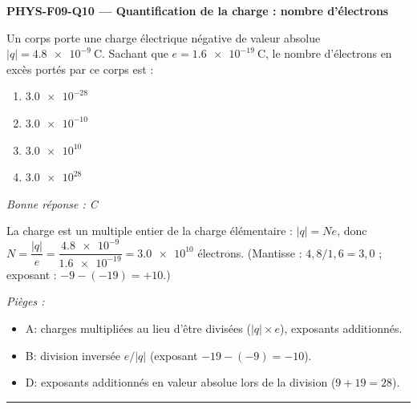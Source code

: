 \documentclass[11pt,a4paper]{article}
\begin{document}
\noindent\textbf{PHYS-F09-Q10 --- Quantification de la charge : nombre d'électrons}\par
Un corps porte une charge électrique négative de valeur absolue $|q|=\qty{4.8e-9}{\coulomb}$. Sachant que $e=\qty{1.6e-19}{\coulomb}$, le nombre d'électrons en excès portés par ce corps est :
\begin{enumerate}[label=\Alph*)]
\item $\num{3.0e-28}$
\item $\num{3.0e-10}$
\item $\num{3.0e10}$
\item $\num{3.0e28}$
\end{enumerate}
\textit{Bonne réponse : C}\par
La charge est un multiple entier de la charge élémentaire : $|q|=N e$, donc $N=\dfrac{|q|}{e}=\dfrac{\num{4.8e-9}}{\num{1.6e-19}}=\num{3.0e10}$ électrons. (Mantisse : $4{,}8/1{,}6=3{,}0$ ; exposant : $-9-(-19)=+10$.)\par
\textit{Pièges :}
\begin{itemize}
\item A: charges multipliées au lieu d'être divisées ($|q|\times e$), exposants additionnés.
\item B: division inversée $e/|q|$ (exposant $-19-(-9)=-10$).
\item D: exposants additionnés en valeur absolue lors de la division ($9+19=28$).
\end{itemize}
\vspace{8pt}\hrule\vspace{8pt}
\end{document}
